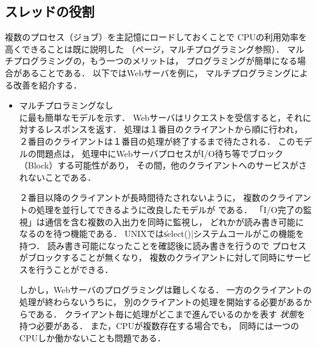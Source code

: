 \subsection{スレッドの役割}
複数のプロセス（ジョブ）を主記憶にロードしておくことで
CPUの利用効率を高くできることは既に説明した
（\pageref{multiprogramming}ページ，マルチプログラミング参照）．
マルチプログラミングの，もう一つのメリットは，
プログラミングが簡単になる場合があることである．
以下ではWebサーバを例に，
マルチプログラミングによる改善を紹介する．

\begin{itemize}
\item マルチプロラミングなし \\
  に最も簡単なモデルを示す．
  Webサーバはリクエストを受信すると，それに対するレスポンスを返す．
  処理は１番目のクライアントから順に行われ，
  ２番目のクライアントは１番目の処理が終了するまで待たされる．
  このモデルの問題点は，
  処理中にWebサーバプロセスがI/O待ち等でブロック（Block）する可能性があり，
  その間，他のクライアントへのサービスがされないことである．

  ２番目以降のクライアントが長時間待たされないように，
  複数のクライアントの処理を並行してできるように改良したモデルが
  である．
  「I/O完了の監視」は通信を含む複数の入出力を同時に監視し，
  どれかが読み書き可能になるのを待つ機能である．
  UNIXでは\|select()|システムコールがこの機能を持つ．
  読み書き可能になったことを確認後に読み書きを行うので
  プロセスがブロックすることが無くなり，
  複数のクライアントに対して同時にサービスを行うことができる．

  しかし，Webサーバのプログラミングは難しくなる．
  一方のクライアントの処理が終わらないうちに，
  別のクライアントの処理を開始する必要があるからである．
  クライアント毎に処理がどこまで進んでいるのかを表す
  \emph{状態}を持つ必要がある．
  また，CPUが複数存在する場合でも，
  同時には一つのCPUしか働かないことも問題である．


\end{itemize}
